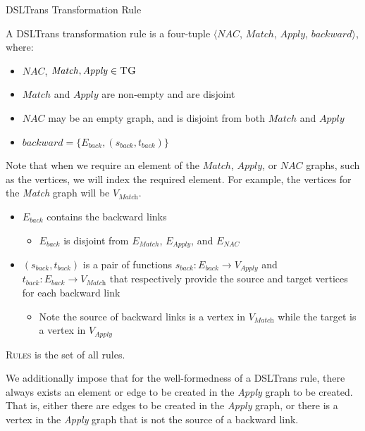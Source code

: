 \begin{definition}{DSLTrans Transformation Rule\\}
\label{def:transformation_rule}

A DSLTrans transformation rule is a four-tuple $\big\langle \mathit{NAC}$, $\mathit{Match}$, $\mathit{Apply}$, $\mathit{backward}\big\rangle$, where:

\begin{itemize}
\item $\mathit{NAC}$, $\mathit{Match}, \mathit{Apply} \in \textsc{TG}$
\item $\mathit{Match}$ and $\mathit{Apply} $ are non-empty and are disjoint
\item $\mathit{NAC}$ may be an empty graph, and is disjoint from both $\mathit{Match}$ and $\mathit{Apply} $
\item $\mathit{backward} = \{E_{back}, (s_{back}, t_{back})\}$
\end{itemize}  

Note that when we require an element of the $\mathit{Match}$, $\mathit{Apply}$, or $\mathit{NAC}$ graphs, such as the vertices, we will index the required element. For example, the vertices for the \textit{Match} graph will be $V_{\textit{Match}}$.

\begin{itemize}
\item $E_{back}$ contains the backward links
\begin{itemize}
\item $E_{back} $ is disjoint from $E_{Match}$,  $E_{Apply}$, and $E_{NAC}$
\end{itemize}
\item $(s_{back}, t_{back})$ is a pair of functions $s_{back}: E_{back}\rightarrow V_{\textit{Apply}}$ and $t_{back}: E_{back}\rightarrow V_{\textit{Match}}$ that respectively provide the source and target vertices for each backward link
\begin{itemize}
\item Note the source of backward links is a vertex in $V_{\textit{Match}}$ while the target is a vertex in $V_{\textit{Apply}}$
\end{itemize}
\end{itemize}

\textsc{Rules} is the set of all rules.

\end{definition}

We additionally impose that for the well-formedness of a DSLTrans rule, there always exists an element or edge to be created in the \textit{Apply} graph to be created. That is, either there are edges to be created in the \textit{Apply} graph, or there is a vertex in the \textit{Apply} graph that is not the source of a backward link.

